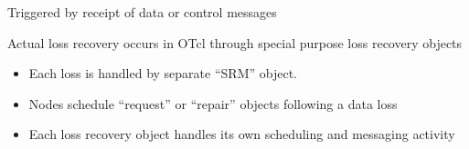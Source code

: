 \documentclass[landscape]{foils}
\begin{document}
\begin{comment}
\item Acquire and configure agent
\item Attach agent to node
\item open log and trace files as required
\item configure a traffic generator and traffic source
\item attqach application to agent
\item notice setting packet size
\item start agent and traffic source separately
\end{comment}


\begin{comment}
\item Separate loss recovery objects
\item separate session message handling object
\item Loss detection is in C++,
\item loss recovery is in OTcl
\item number of bottlenecks in memory are expected
\item wait for scaling issues following
\end{comment}

\begin{list}{}{}\item
Triggered by receipt of data or control messages

\item
{}

\item
Actual loss recovery occurs in OTcl through special purpose
loss recovery  objects
\end{list}

\begin{comment}
\item single reqeust helps speedup scheduling
\item also help schedule request periods for statis gathering simple
\end{comment}

\begin{itemize}
\item Each loss is handled by separate ``SRM'' object.
\item Nodes schedule ``request'' or ``repair'' objects following
  a data loss
\item Each loss recovery object handles its own scheduling and messaging
  activity
\end{itemize}
\end{document}
